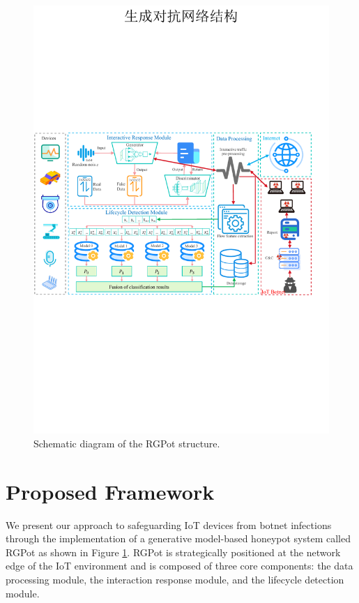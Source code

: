 \documentclass[journal]{IEEEtai}
\begin{document}
\begin{figure}[!h]
	\centering
	\includegraphics[width = \textwidth]{Figures/structure.pdf}
	\caption{Schematic diagram of the RGPot structure.}
	\label{structure}
\end{figure}


\section{Proposed Framework}
\label{Proposed Framework}

We present our approach to safeguarding IoT devices from botnet infections through the implementation of a generative model-based honeypot system called RGPot as shown in Figure \ref{structure}. 
RGPot is strategically positioned at the network edge of the IoT environment and is composed of three core components: the data processing module, the interaction response module, and the lifecycle detection module.
\end{document}
